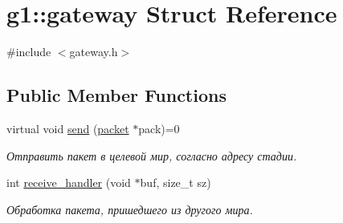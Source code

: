 \hypertarget{structg1_1_1gateway}{}\section{g1\+:\+:gateway Struct Reference}
\label{structg1_1_1gateway}


{\ttfamily \#include $<$gateway.\+h$>$}

\subsection*{Public Member Functions}
\begin{DoxyCompactItemize}
\item 
virtual void \hyperlink{structg1_1_1gateway_a5748219660a573356ab0e52f715eebbf}{send} (\hyperlink{structg1_1_1packet}{packet} $\ast$pack)=0
\begin{DoxyCompactList}\small\item\em Отправить пакет в целевой мир, согласно адресу стадии. \end{DoxyCompactList}\item 
int \hyperlink{structg1_1_1gateway_a8554ef0120b9fbb279087eb1d8c205dd}{receive\+\_\+handler} (void $\ast$buf, size\+\_\+t sz)
\begin{DoxyCompactList}\small\item\em Обработка пакета, пришедшего из другого мира. \end{DoxyCompactList}\end{DoxyCompactItemize}
